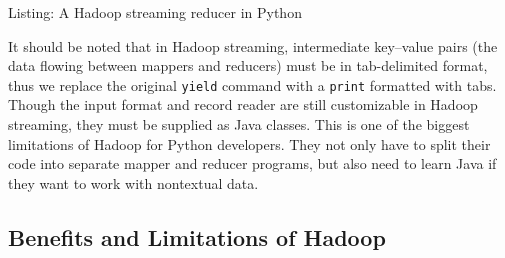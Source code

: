 \documentclass[]{krantz}
\newenvironment{Shaded}{\begin{snugshade}}{\end{snugshade}}
\newcommand{\KeywordTok}[1]{\textcolor[rgb]{0.13,0.29,0.53}{\textbf{#1}}}
\newcommand{\CharTok}[1]{\textcolor[rgb]{0.31,0.60,0.02}{#1}}
\newcommand{\SpecialCharTok}[1]{\textcolor[rgb]{0.00,0.00,0.00}{#1}}
\newcommand{\StringTok}[1]{\textcolor[rgb]{0.31,0.60,0.02}{#1}}
\newcommand{\ImportTok}[1]{#1}
\newcommand{\CommentTok}[1]{\textcolor[rgb]{0.56,0.35,0.01}{\textit{#1}}}
\newcommand{\VariableTok}[1]{\textcolor[rgb]{0.00,0.00,0.00}{#1}}
\newcommand{\ControlFlowTok}[1]{\textcolor[rgb]{0.13,0.29,0.53}{\textbf{#1}}}
\newcommand{\OperatorTok}[1]{\textcolor[rgb]{0.81,0.36,0.00}{\textbf{#1}}}
\newcommand{\BuiltInTok}[1]{#1}
\newcommand{\NormalTok}[1]{#1}
\begin{document}
\begin{Shaded}
\end{Shaded}

Listing: A Hadoop streaming reducer in Python

It should be noted that in Hadoop streaming, intermediate key--value
pairs (the data flowing between mappers and reducers) must be in
tab-delimited format, thus we replace the original \texttt{yield}
command with a \texttt{print} formatted with tabs. Though the input
format and record reader are still customizable in Hadoop streaming,
they must be supplied as Java classes. This is one of the biggest
limitations of Hadoop for Python developers. They not only have to split
their code into separate mapper and reducer programs, but also need to
learn Java if they want to work with nontextual data.

\subsection{Benefits and Limitations of
Hadoop}\label{benefits-and-limitations-of-hadoop}
\end{document}
